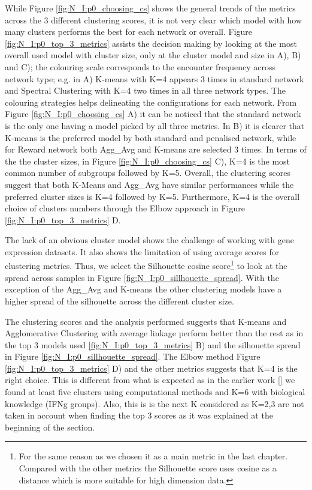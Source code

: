 While Figure \ref{fig:N_I:p0_choosing_cs} shows the general trends of the metrics across the 3 different clustering scores, it is not very clear which model with how many clusters performs the best for each network or overall. Figure \ref{fig:N_I:p0_top_3_metrics} assists the decision making by looking at the most overall used model with cluster size, only at the cluster model and size in A), B) and C); the colouring scale corresponds to the encounter frequency across network type; e.g. in A) K-means with K=4 appears 3 times in standard network and Spectral Clustering with K=4 two times in all three network types. The colouring strategies helps delineating the configurations for each network. From Figure \ref{fig:N_I:p0_choosing_cs} A) it can be noticed that the standard network is the only one having a model picked by all three metrics. In B) it is clearer that K-means is the preferred model by both standard and penalised network, while for Reward network both Agg\_Avg and K-means are selected 3 times. In terms of the the cluster sizes, in Figure \ref{fig:N_I:p0_choosing_cs} C), K=4 is the most common number of subgroups followed by K=5. Overall, the clustering scores suggest that both K-Means and Agg\_Avg have similar performances while the preferred cluster sizes is K=4 followed by K=5. Furthermore, K=4 is the overall choice of clusters numbers through the Elbow approach in Figure \ref{fig:N_I:p0_top_3_metrics} D.


The lack of an obvious cluster model shows the challenge of working with gene expression datasets. It also shows the limitation of using average scores for clustering metrics. Thus, we select the Silhouette cosine score\footnote{For the same reason as we chosen it as a main metric in the last chapter. Compared with the other metrics the Silhouette score uses cosine as a distance which is more suitable for high dimension data.} to look at the spread across samples in Figure \ref{fig:N_I:p0_sillhouette_spread}. With the exception of the Agg\_Avg and K-means the other clustering models have a higher spread of the silhouette across the different cluster size.

The clustering scores and the analysis performed suggests that K-means and Agglomerative Clustering with average linkage perform better than the rest as in the top 3 models used \ref{fig:N_I:p0_top_3_metrics} B) and the silhouette spread in Figure \ref{fig:N_I:p0_sillhouette_spread}. The Elbow method Figure \ref{fig:N_I:p0_top_3_metrics} D) and the other metrics suggests that K=4 is the right choice. This is different from what is expected as in the earlier work \ref{} we found at least five clusters using computational methods and K=6 with biological knowledge (IFNg groups). Also, this is is the next K considered as K=2,3 are not taken in account when finding the top 3 scores as it was explained at the beginning of the section.

